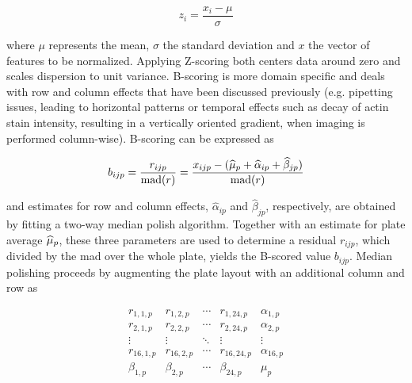 \begin{equation}
  z_i = \frac{x_i - \mu}{\sigma}
\end{equation}

where $\mu$ represents the mean, $\sigma$ the standard deviation and $x$ the vector of features to be normalized. Applying Z-scoring both centers data around zero and scales dispersion to unit variance. B-scoring is more domain specific and deals with row and column effects that have been discussed previously (e.g. pipetting issues, leading to horizontal patterns or temporal effects such as decay of actin stain intensity, resulting in a vertically oriented gradient, when imaging is performed column-wise). B-scoring can be expressed as

\begin{equation}
  b_{ijp} = \frac{r_{ijp}}{\operatorname{mad}(r)} = \frac{x_{ijp} - (\widehat{\mu}_p + \widehat{\alpha}_{ip} + \widehat{\beta}_{jp})}{\operatorname{mad}(r)}
\end{equation}

and estimates for row and column effects, $\widehat{\alpha}_{ip}$ and $\widehat{\beta}_{jp}$, respectively, are obtained by fitting a two-way median polish algorithm. Together with an estimate for plate average $\widehat{\mu}_p$, these three parameters are used to determine a residual $r_{ijp}$, which divided by the \gls{mad} over the whole plate, yields the B-scored value $b_{ijp}$. Median polishing proceeds by augmenting the plate layout with an additional column and row as

\begin{equation*}
  \begin{array}{cccc|c}
    r_{1,1,p} & r_{1,2,p} & \cdots & r_{1,24,p} & \alpha_{1,p} \\
    r_{2,1,p} & r_{2,2,p} & \cdots & r_{2,24,p} & \alpha_{2,p} \\
    \vdots  & \vdots  & \ddots & \vdots & \vdots \\
    r_{16,1,p} & r_{16,2,p} & \cdots & r_{16,24,p} & \alpha_{16,p} \\
    \hline
    \beta_{1,p} & \beta_{2,p} & \cdots & \beta_{24,p} & \mu_{p} \\
  \end{array}
\end{equation*}

